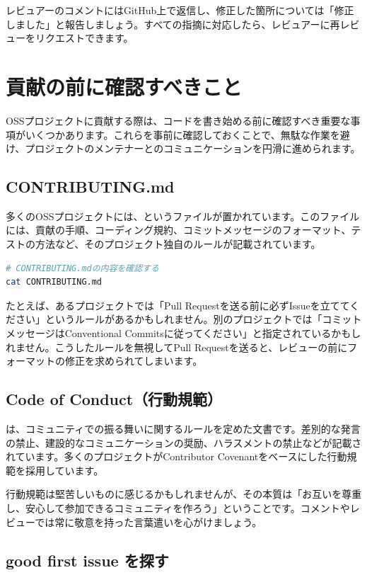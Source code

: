 レビュアーのコメントにはGitHub上で返信し、修正した箇所については「修正しました」と報告しましょう。すべての指摘に対応したら、レビュアーに再レビューをリクエストできます。

\section{貢献の前に確認すべきこと}

OSSプロジェクトに貢献する際は、コードを書き始める前に確認すべき重要な事項がいくつかあります。これらを事前に確認しておくことで、無駄な作業を避け、プロジェクトのメンテナーとのコミュニケーションを円滑に進められます。

\subsection{CONTRIBUTING.md}

多くのOSSプロジェクトには、というファイルが置かれています。このファイルには、貢献の手順、コーディング規約、コミットメッセージのフォーマット、テストの方法など、そのプロジェクト独自のルールが記載されています。

\begin{lstlisting}[language=bash]
# CONTRIBUTING.mdの内容を確認する
cat CONTRIBUTING.md
\end{lstlisting}

たとえば、あるプロジェクトでは「Pull Requestを送る前に必ずIssueを立ててください」というルールがあるかもしれません。別のプロジェクトでは「コミットメッセージはConventional Commitsに従ってください」と指定されているかもしれません。こうしたルールを無視してPull Requestを送ると、レビューの前にフォーマットの修正を求められてしまいます。

\subsection{Code of Conduct（行動規範）}

は、コミュニティでの振る舞いに関するルールを定めた文書です。差別的な発言の禁止、建設的なコミュニケーションの奨励、ハラスメントの禁止などが記載されています。多くのプロジェクトがContributor Covenantをベースにした行動規範を採用しています。

行動規範は堅苦しいものに感じるかもしれませんが、その本質は「お互いを尊重し、安心して参加できるコミュニティを作ろう」ということです。コメントやレビューでは常に敬意を持った言葉遣いを心がけましょう。

\subsection{good first issue を探す}

